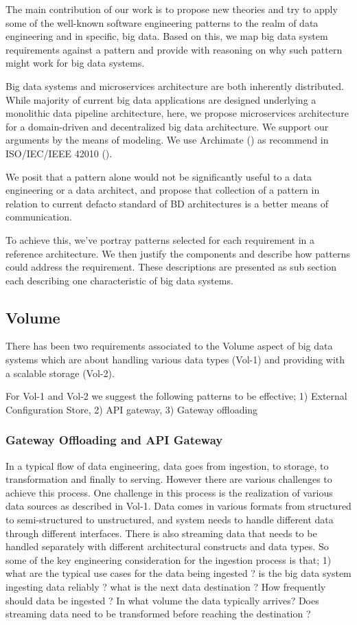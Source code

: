 \documentclass[conference]{IEEEtran}
\begin{document}
The main contribution of our work is to propose new theories and try to apply some of the well-known software engineering patterns to the realm of data engineering and in specific, big data. Based on this, we map big data system requirements against a pattern and provide with reasoning on why such pattern might work for big data systems. 

Big data systems and microservices architecture are both inherently distributed. While majority of current big data applications are designed underlying a monolithic data pipeline architecture, here, we propose microservices architecture for a domain-driven and decentralized big data architecture. We support our arguments by the means of modeling. We use Archimate (\cite{lankhorst2013language}) as recommend in ISO/IEC/IEEE 42010 (\cite{Chaabane}). 

We posit that a pattern alone would not be significantly useful to a data engineering or a data architect, and propose that collection of a pattern in relation to current defacto standard of BD architectures is a better means of communication. 

To achieve this, we've portray patterns selected for each requirement in a reference architecture. We then justify the components and describe how patterns could address the requirement. These descriptions are presented as sub section each describing one characteristic of big data systems. 


\subsection{Volume}

There has been two requirements associated to the Volume aspect of big data systems which are about handling various data types (Vol-1) and providing with a scalable storage (Vol-2). 

For Vol-1 and Vol-2 we suggest the following patterns to be effective; 1) External Configuration Store, 2) API gateway, 3) Gateway offloading 

\subsubsection{Gateway Offloading and API Gateway}

In a typical flow of data engineering, data goes from ingestion, to storage, to transformation and finally to serving. However there are various challenges to achieve this process. One challenge in this process is the realization of various data sources as described in Vol-1. Data comes in various formats from structured to semi-structured to unstructured, and system needs to handle different data through different interfaces. There is also streaming data that needs to be handled separately with different architectural constructs and data types. So some of the key engineering consideration for the ingestion process is that; 1) what are the typical use cases for the data being ingested ? is the big data system ingesting data reliably ? what is the next data destination ? How frequently should data be ingested ? In what volume the data typically arrives? Does streaming data need to be transformed before reaching the destination ? 
\end{document}
